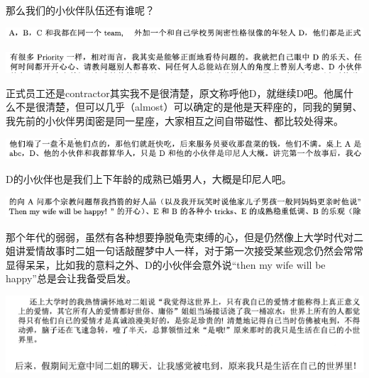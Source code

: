 \documentclass[9pt, b5paper]{article}
\begin{document}
那么我们的小伙伴队伍还有谁呢？

\begin{center}
\includegraphics[width=.9\linewidth]{./pic/backups_plans_20210507_211859.png}
\end{center}

\begin{center}
\includegraphics[width=.9\linewidth]{./pic/backups_plans_20210508_083334.png}
\end{center}

正式员工还是contractor其实我不是很清楚，原文称呼他D，就继续D吧。他属什么不是很清楚，但可以几乎（almost）可以确定的是他是天秤座的，同我的舅舅、我先前的小伙伴男闺密是同一星座，大家相互之间自带磁性、都比较处得来。

\begin{center}
\includegraphics[width=.9\linewidth]{./pic/backups_plans_20210507_212547.png}
\end{center}

D的小伙伴也是我们上下年龄的成熟已婚男人，大概是印尼人吧。

\begin{center}
\includegraphics[width=.9\linewidth]{./pic/backups_plans_20210508_083355.png}
\end{center}

那个年代的弱弱，虽然有各种想要挣脱龟壳束缚的心，但是仍然像上大学时代对二姐讲爱情故事时二姐一句话敲醒梦中人一样，对于第一次接受某些观念仍然会常常显得呆呆，比如我的意料之外、D的小伙伴会意外说“then my wife will be happy”总是会让我备受启发。

\begin{center}
\includegraphics[width=.9\linewidth]{./pic/backups_plans_20210508_084127.png}
\end{center}
\end{document}
